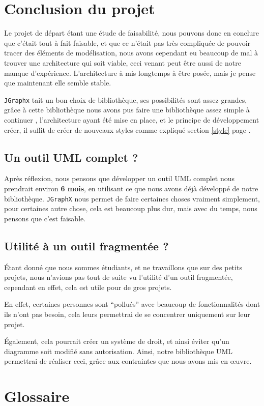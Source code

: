 \documentclass[12pt,a4paper,oneside]{book}
\begin{document}
	\chapter{Conclusion du projet}
	\nouveauChapitre
	Le projet de départ étant une étude de faisabilité, nous pouvons donc en conclure que c'était tout à fait faisable, et que ce n'était pas très compliquée de pouvoir
	tracer des éléments de modélisation, nous avons cependant eu beaucoup de mal à trouver une architecture qui soit viable, ceci venant peut être aussi de notre manque
	d'expérience. L'architecture à mis longtemps à être posée, mais je pense que maintenant elle semble stable.

	\texttt{JGraphx} tait un bon choix de bibliothèque, ses possibilités sont assez grandes, grâce à cette bibliothèque nous avons pus faire une bibliothèque assez simple à continuer
,
l'architecture ayant été mise en place, et le principe de développement créer, il suffit de créer de nouveaux styles comme expliqué section \ref{style} page \pageref{style}. 
	\section{Un outil UML complet ?}
	Après réflexion, nous pensons que développer un outil UML complet nous prendrait environ\textbf{ 6 mois}, 
	en utilisant ce que nous avons déjà développé de notre bibliothèque. \texttt{JGraphX} nous permet de faire certaines choses vraiment simplement, pour certaines autre chose, cela
	est beaucoup plus dur, mais avec du temps, nous pensons que c'est faisable. 
	\section{Utilité à un outil fragmentée ?}
	Étant donné que nous sommes étudiants, et ne travaillons que sur des petits projets, nous n'avions pas tout de suite vu l'utilité d'un outil fragmentée, cependant
en effet, cela est utile pour de gros projets. 

En effet, certaines personnes sont ``pollués'' avec beaucoup de fonctionnalités dont ils n'ont pas besoin,
cela leurs permettrai de se concentrer uniquement sur leur projet. 

Également, cela pourrait créer un système de droit, et ainsi éviter qu'un diagramme soit modifié
sans autorisation. Ainsi, notre bibliothèque UML permettrai de réaliser ceci, grâce aux contraintes que nous avons mis en \oe{}uvre.
	
	\closeout\glossaireVar
	\appendix
	\chapter{Glossaire}\label{glossaire}
	\nouveauChapitre
	\begin{sortedlist}
		
	\end{sortedlist}
\end{document}
